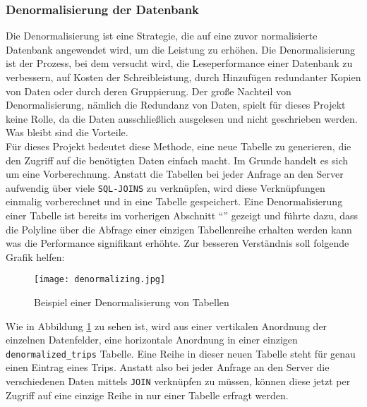 
  \subsubsection{Denormalisierung der Datenbank}
  \label{ssub:denormalisierung_der_datenbank}
    Die Denormalisierung ist eine Strategie, die auf eine zuvor normalisierte Datenbank angewendet wird, um die Leistung zu erhöhen. Die Denormalisierung ist der Prozess, bei dem versucht wird, die Leseperformance einer Datenbank zu verbessern, auf Kosten der Schreibleistung, durch Hinzufügen redundanter Kopien von Daten oder durch deren Gruppierung.\parencite{sanders}
    Der große Nachteil von Denormalisierung, nämlich die Redundanz von Daten, spielt für dieses Projekt keine Rolle, da die Daten ausschließlich ausgelesen und nicht geschrieben werden. Was bleibt sind die Vorteile.\\

    Für dieses Projekt bedeutet diese Methode, eine neue Tabelle zu generieren, die den Zugriff auf die benötigten Daten einfach macht. Im Grunde handelt es sich um eine Vorberechnung. Anstatt die Tabellen bei jeder Anfrage an den Server aufwendig über viele \texttt{SQL-JOINS} zu verknüpfen, wird diese Verknüpfungen einmalig vorberechnet und in eine Tabelle gespeichert. Eine Denormalisierung  einer Tabelle ist bereits im vorherigen Abschnitt "`"' gezeigt und führte dazu, dass die Polyline über die Abfrage einer einzigen Tabellenreihe erhalten werden kann was die Performance signifikant erhöhte. Zur besseren Verständnis soll folgende Grafik helfen:

    \begin{figure}[htbp]
      \begin{center}
        \texttt{[image: denormalizing.jpg]}
        \caption{Beispiel einer Denormalisierung von Tabellen}
        \label{fig:denormalizing}
      \end{center}
    \end{figure}

    Wie in Abbildung \ref{fig:denormalizing} zu sehen ist, wird aus einer vertikalen Anordnung der einzelnen Datenfelder, eine horizontale Anordnung in einer einzigen \texttt{denormalized\_trips} Tabelle. Eine Reihe in dieser neuen Tabelle steht für genau einen Eintrag eines Trips. Anstatt also bei jeder Anfrage an den Server die verschiedenen Daten mittels \texttt{JOIN} verknüpfen zu müssen, können diese jetzt per Zugriff auf eine einzige Reihe in nur einer Tabelle erfragt werden.

